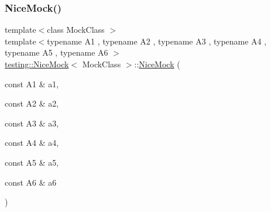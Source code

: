\mbox{\label{classtesting_1_1_nice_mock_a156d0fce85ac08abffdf4aa0c3975f81}} 
\subsubsection{\texorpdfstring{NiceMock()}{NiceMock()}\hspace{0.1cm}{\footnotesize\ttfamily [13/17]}}
{\footnotesize\ttfamily template$<$class Mock\+Class $>$ \\
template$<$typename A1 , typename A2 , typename A3 , typename A4 , typename A5 , typename A6 $>$ \\
\mbox{\hyperlink{classtesting_1_1_nice_mock}{testing\+::\+Nice\+Mock}}$<$ Mock\+Class $>$\+::\mbox{\hyperlink{classtesting_1_1_nice_mock}{Nice\+Mock}} (\begin{DoxyParamCaption}\item[{const A1 \&}]{a1,  }\item[{const A2 \&}]{a2,  }\item[{const A3 \&}]{a3,  }\item[{const A4 \&}]{a4,  }\item[{const A5 \&}]{a5,  }\item[{const A6 \&}]{a6 }\end{DoxyParamCaption})\hspace{0.3cm}{\ttfamily [inline]}}

\mbox{\label{classtesting_1_1_nice_mock_a946d75ece1fa3a066b7d9d6ab7828c55}} 
